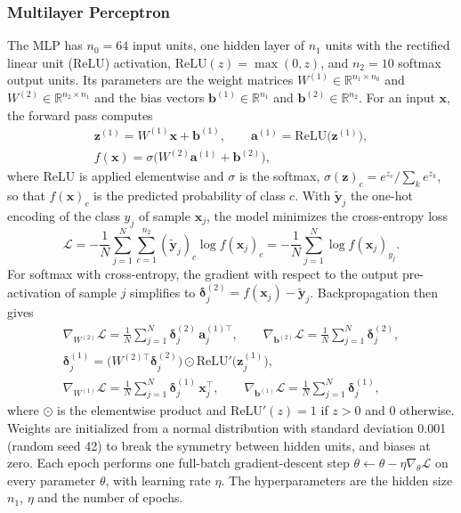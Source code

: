 \documentclass[conference]{IEEEtran}
\begin{document}
\subsubsection{Multilayer Perceptron}
The MLP has $n_0 = 64$ input units, one hidden layer of $n_1$ units with the rectified linear unit (ReLU) activation, $\mathrm{ReLU}(z) = \max(0, z)$, and $n_2 = 10$ softmax output units. Its parameters are the weight matrices $W^{(1)} \in \mathbb R^{n_1\times n_0}$ and $W^{(2)} \in \mathbb R^{n_2\times n_1}$ and the bias vectors $\mathbf b^{(1)} \in \mathbb R^{n_1}$ and $\mathbf b^{(2)} \in \mathbb R^{n_2}$. For an input $\mathbf x$, the forward pass computes
\begin{gather}
\mathbf z^{(1)} = W^{(1)}\mathbf x + \mathbf b^{(1)}, \qquad \mathbf a^{(1)} = \mathrm{ReLU}\bigl(\mathbf z^{(1)}\bigr), \nonumber\\
f(\mathbf x) = \sigma\bigl(W^{(2)}\mathbf a^{(1)} + \mathbf b^{(2)}\bigr),
\end{gather}
where ReLU is applied elementwise and $\sigma$ is the softmax, $\sigma(\mathbf z)_c = e^{z_c}/\sum_{k} e^{z_k}$, so that $f(\mathbf x)_c$ is the predicted probability of class $c$. With $\tilde{\mathbf y}_j$ the one-hot encoding of the class $y_j$ of sample $\mathbf x_j$, the model minimizes the cross-entropy loss
\begin{equation}
\mathcal L = -\frac{1}{N}\sum_{j=1}^{N}\sum_{c=1}^{n_2}(\tilde{\mathbf y}_j)_c\log f(\mathbf x_j)_c = -\frac{1}{N}\sum_{j=1}^{N}\log f(\mathbf x_j)_{y_j}.
\end{equation}
For softmax with cross-entropy, the gradient with respect to the output pre-activation of sample $j$ simplifies to $\boldsymbol\delta^{(2)}_j = f(\mathbf x_j) - \tilde{\mathbf y}_j$. Backpropagation then gives
\begin{gather*}
\nabla_{W^{(2)}}\mathcal L = \frac{1}{N}\sum_{j=1}^{N}\boldsymbol\delta^{(2)}_j\,\mathbf a^{(1)\top}_j, \qquad
\nabla_{\mathbf b^{(2)}}\mathcal L = \frac{1}{N}\sum_{j=1}^{N}\boldsymbol\delta^{(2)}_j,\\
\boldsymbol\delta^{(1)}_j = \bigl(W^{(2)\top}\boldsymbol\delta^{(2)}_j\bigr)\odot\mathrm{ReLU}'\bigl(\mathbf z^{(1)}_j\bigr),\\
\nabla_{W^{(1)}}\mathcal L = \frac{1}{N}\sum_{j=1}^{N}\boldsymbol\delta^{(1)}_j\,\mathbf x_j^\top, \qquad
\nabla_{\mathbf b^{(1)}}\mathcal L = \frac{1}{N}\sum_{j=1}^{N}\boldsymbol\delta^{(1)}_j,
\end{gather*}
where $\odot$ is the elementwise product and $\mathrm{ReLU}'(z) = 1$ if $z > 0$ and $0$ otherwise. Weights are initialized from a normal distribution with standard deviation 0.001 (random seed 42) to break the symmetry between hidden units, and biases at zero. Each epoch performs one full-batch gradient-descent step $\theta \leftarrow \theta - \eta\nabla_\theta\mathcal L$ on every parameter $\theta$, with learning rate $\eta$. The hyperparameters are the hidden size $n_1$, $\eta$ and the number of epochs.
\end{document}
